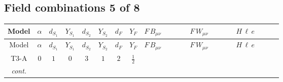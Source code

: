 \documentclass[8pt]{article}
\begin{document}
\begin{landscape}
\subsection*{Field combinations 5 of 8}
\begin{longtable}{@{}cccccccc >{\raggedright\arraybackslash}p{0.21\linewidth} >{\raggedright\arraybackslash}p{0.21\linewidth} >{\raggedright\arraybackslash}p{0.21\linewidth}@{}}
\toprule
Model & $\alpha$ & $d_{S_1}$ & $Y_{S_1}$ & $d_{S_2}$ & $Y_{S_2}$ & $d_F$ & $Y_F$ & $F\,B_{\mu\nu}$ & $F\,W_{\mu\nu}$ & $H\,\ell\,e$ \\
\midrule
\endfirsthead
\toprule
Model & $\alpha$ & $d_{S_1}$ & $Y_{S_1}$ & $d_{S_2}$ & $Y_{S_2}$ & $d_F$ & $Y_F$ & $F\,B_{\mu\nu}$ & $F\,W_{\mu\nu}$ & $H\,\ell\,e$ \\
\midrule
\endhead
T3-A & $0$ & $1$ & $0$ & $3$ & $1$ & $2$ & $\frac{1}{2}$ & \scriptsize\adjustbox{max width=\linewidth}{$\begin{gathered} -\frac{1}{2} \hbar  \log \left(\frac{\bar{\mu}^{2}}{M_F^2}\right) B_{\mu _1\mu _2}^2\end{gathered}$} & \scriptsize\adjustbox{max width=\linewidth}{$\begin{gathered} -\frac{1}{2} \hbar  \log \left(\frac{\bar{\mu}^{2}}{M_F^2}\right) \left(W_{\mu _1\mu _2}^{A_1}\right){}^2\end{gathered}$} & \scriptsize\adjustbox{max width=\linewidth}{$\begin{gathered} +\frac{\hbar  \overline{y_{1,i_3,r_1}} \overline{L_{a_1,i_2}}\, P_R\, e_{i_1} H_{a_1} y_{1,i_2,r_1} Y_{e,i_3,i_1}}{4 \epsilon } \\ +\frac{3}{8} \hbar  \overline{y_{1,i_3,r_1}} \overline{L_{a_1,i_2}}\, P_R\, e_{i_1} H_{a_1} y_{1,i_2,r_1} Y_{e,i_3,i_1} \\ +\frac{\sqrt{3} \hbar  \overline{y_{2,i_3,r_1}} \overline{L_{a_1,i_2}}\, P_R\, e_{i_1} H_{a_1} y_{2,i_2,r_1} Y_{e,i_3,i_1}}{4 \epsilon }\end{gathered}$} \\
\textit{cont.} &  &  &  &  &  &  &  &  &  & \scriptsize\adjustbox{max width=\linewidth}{$\begin{gathered} +\frac{3}{8} \sqrt{3} \hbar  \overline{y_{2,i_3,r_1}} \overline{L_{a_1,i_2}}\, P_R\, e_{i_1} H_{a_1} y_{2,i_2,r_1} Y_{e,i_3,i_1} \\ +\frac{\hbar  \overline{y_{1,i_1,r_1}} \overline{Y_{e,i_3,i_2}} \overline{e_{i_2}}\, P_L\, L_{a_1,i_1} y_{1,i_3,r_1} H_{a_1}{}^{\dagger }}{4 \epsilon } \\ +\frac{3}{8} \hbar  \overline{y_{1,i_1,r_1}} \overline{Y_{e,i_3,i_2}} \overline{e_{i_2}}\, P_L\, L_{a_1,i_1} y_{1,i_3,r_1} H_{a_1}{}^{\dagger }\end{gathered}$} \\

\end{longtable}
\end{landscape}
\end{document}
